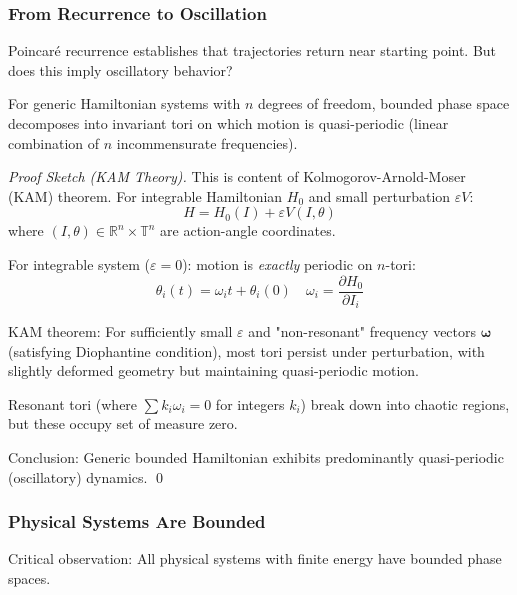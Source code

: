 \documentclass[11pt,onecolumn]{article}
\begin{document}
\subsubsection{From Recurrence to Oscillation}

Poincar\'e recurrence establishes that trajectories return near starting point. But does this imply oscillatory behavior?

\begin{proposition}
For generic Hamiltonian systems with $n$ degrees of freedom, bounded phase space decomposes into invariant tori on which motion is quasi-periodic (linear combination of $n$ incommensurate frequencies).
\end{proposition}

\begin{proof}[Proof Sketch (KAM Theory)]
This is content of Kolmogorov-Arnold-Moser (KAM) theorem. For integrable Hamiltonian $H_0$ and small perturbation $\varepsilon V$:
\begin{equation}
H = H_0(I) + \varepsilon V(I, \theta)
\end{equation}
where $(I, \theta) \in \mathbb{R}^n \times \mathbb{T}^n$ are action-angle coordinates.

For integrable system ($\varepsilon = 0$): motion is \textit{exactly} periodic on $n$-tori:
\begin{equation}
\theta_i(t) = \omega_i t + \theta_i(0) \quad \omega_i = \frac{\partial H_0}{\partial I_i}
\end{equation}

KAM theorem: For sufficiently small $\varepsilon$ and "non-resonant" frequency vectors $\boldsymbol{\omega}$ (satisfying Diophantine condition), most tori persist under perturbation, with slightly deformed geometry but maintaining quasi-periodic motion.

Resonant tori (where $\sum k_i \omega_i = 0$ for integers $k_i$) break down into chaotic regions, but these occupy set of measure zero.

Conclusion: Generic bounded Hamiltonian exhibits predominantly quasi-periodic (oscillatory) dynamics. \qed
\end{proof}

\subsubsection{Physical Systems Are Bounded}

Critical observation: All physical systems with finite energy have bounded phase spaces.
\end{document}
